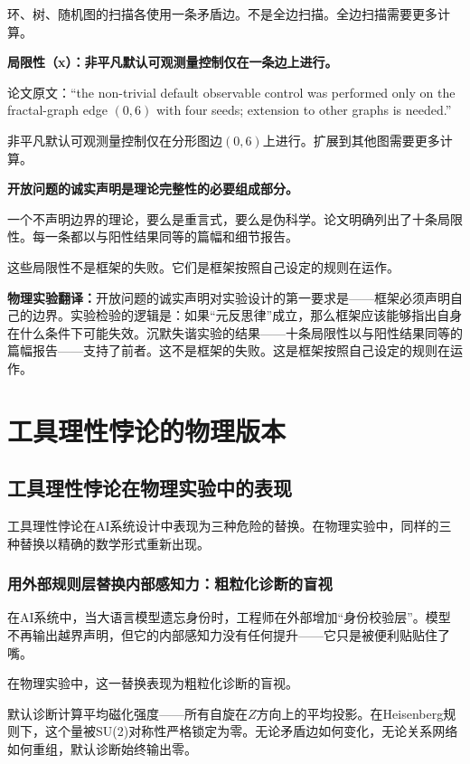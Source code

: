 \documentclass[11pt,a4paper]{book}
\theoremstyle{definition}
\begin{document}
环、树、随机图的扫描各使用一条矛盾边。不是全边扫描。全边扫描需要更多计算。

\textbf{局限性（x）：非平凡默认可观测量控制仅在一条边上进行。}

论文原文：“the non-trivial default observable control was performed only on the fractal-graph edge $(0,6)$ with four seeds; extension to other graphs is needed.”

非平凡默认可观测量控制仅在分形图边$(0,6)$上进行。扩展到其他图需要更多计算。

\textbf{开放问题的诚实声明是理论完整性的必要组成部分。}

一个不声明边界的理论，要么是重言式，要么是伪科学。论文明确列出了十条局限性。每一条都以与阳性结果同等的篇幅和细节报告。

这些局限性不是框架的失败。它们是框架按照自己设定的规则在运作。

\textbf{物理实验翻译：}开放问题的诚实声明对实验设计的第一要求是——框架必须声明自己的边界。实验检验的逻辑是：如果“元反思律”成立，那么框架应该能够指出自身在什么条件下可能失效。沉默失谐实验的结果——十条局限性以与阳性结果同等的篇幅报告——支持了前者。这不是框架的失败。这是框架按照自己设定的规则在运作。

\chapter{工具理性悖论的物理版本}

\section{工具理性悖论在物理实验中的表现}

工具理性悖论在AI系统设计中表现为三种危险的替换。在物理实验中，同样的三种替换以精确的数学形式重新出现。

\subsection{用外部规则层替换内部感知力：粗粒化诊断的盲视}

在AI系统中，当大语言模型遗忘身份时，工程师在外部增加“身份校验层”。模型不再输出越界声明，但它的内部感知力没有任何提升——它只是被便利贴贴住了嘴。

在物理实验中，这一替换表现为粗粒化诊断的盲视。

默认诊断计算平均磁化强度——所有自旋在$Z$方向上的平均投影。在Heisenberg规则下，这个量被SU(2)对称性严格锁定为零。无论矛盾边如何变化，无论关系网络如何重组，默认诊断始终输出零。
\end{document}
